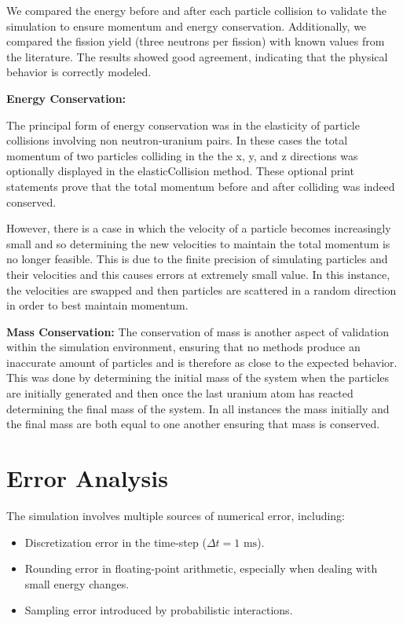 \documentclass[twocolumn, 11pt]{article}
\begin{document}
We compared the energy before and after each particle collision to validate the simulation to ensure momentum and energy conservation. Additionally, we compared the fission yield (three neutrons per fission) with known values from the literature. The results showed good agreement, indicating that the physical behavior is correctly modeled.

\textbf{Energy Conservation:}

The principal form of energy conservation was in the elasticity of particle collisions involving non neutron-uranium pairs. In these cases the total momentum of two particles colliding in the the x, y, and z directions was optionally displayed in the elasticCollision method. These optional print statements prove that the total momentum before and after colliding was indeed conserved.

However, there is a case in which the velocity of a particle becomes increasingly small and so determining the new velocities to maintain the total momentum is no longer feasible. This is due to the finite precision of simulating particles and their velocities and this causes errors at extremely small value. In this instance, the velocities are swapped and then particles are scattered in a random direction in order to best maintain momentum.

\textbf{Mass Conservation:}
The conservation of mass is another aspect of validation within the simulation environment, ensuring that no methods produce an inaccurate amount of particles and is therefore as close to the expected behavior. This was done by determining the initial mass of the system when the particles are initially generated and then once the last uranium atom has reacted determining the final mass of the system. In all instances the mass initially and the final mass are both equal to one another ensuring that mass is conserved.

\section*{Error Analysis}
The simulation involves multiple sources of numerical error, including:
\begin{itemize}
    \item Discretization error in the time-step (\(\Delta t = 1 \text{ ms}\)).
    \item Rounding error in floating-point arithmetic, especially when dealing with small energy changes.
    \item Sampling error introduced by probabilistic interactions.
\end{itemize}
\end{document}
